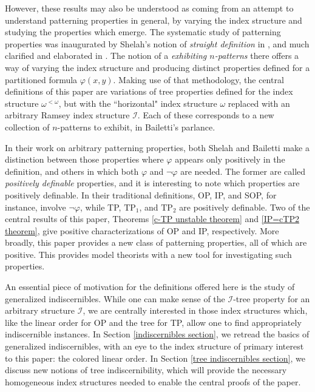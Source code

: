 \documentclass{article}
\newcommand{\calI}{\mathcal{I}}
\newcommand{\TPi}{\text{TP}_1}
\newcommand{\TPii}{\text{TP}_2}
\newcommand{\vphi}{\varphi}
\theoremstyle{definition}
\theoremstyle{definition}
\theoremstyle{definition}
\theoremstyle{definition}
\begin{document}
However, these results may also be understood as coming from an attempt to understand patterning properties in general, by varying the index structure and studying the properties which emerge. The systematic study of patterning properties was inaugurated by Shelah's notion of \textit{straight definition} in \cite{shelah_what_2000}, and much clarified and elaborated in \cite{bailetti_walk_2024}. The notion of a \textit{exhibiting $n$-patterns} there offers a way of varying the index structure and producing distinct properties defined for a partitioned formula $\vphi(x,y)$. Making use of that methodology, the central definitions of this paper are variations of tree properties defined for the index structure $\omega^{<\omega}$, but with the ``horizontal" index structure $\omega$ replaced with an arbitrary Ramsey index structure $\calI$. Each of these corresponds to a new collection of $n$-patterns to exhibit, in Bailetti's parlance.

In their work on arbitrary patterning properties, both Shelah and Bailetti make a distinction between those properties where $\vphi$ appears only positively in the definition, and others in which both $\vphi$ and $\neg\vphi$ are needed. The former are called \textit{positively definable} properties, and it is interesting to note which properties are positively definable. In their traditional definitions, OP, IP, and SOP, for instance, involve $\neg\vphi$, while TP, $\TPi$, and $\TPii$ are positively definable. Two of the central results of this paper, Theorems \ref{c-TP unstable theorem} and \ref{IP=cTP2 theorem}, give positive characterizations of OP and IP, respectively. More broadly, this paper provides a new class of patterning properties, all of which are positive. This provides model theorists with a new tool for investigating such properties.

An essential piece of motivation for the definitions offered here is the study of generalized indiscernibles. While one can make sense of the $\calI$-tree property for an arbitrary structure $\calI$, we are centrally interested in those index structures which, like the linear order for OP and the tree for TP, allow one to find appropriately indiscernible instances. In Section \ref{indiscernibles section}, we retread the basics of generalized indiscernibles, with an eye to the index structure of primary interest to this paper: the colored linear order. In Section \ref{tree indiscernibles section}, we discuss new notions of tree indiscernibility, which will provide the necessary homogeneous index structures needed to enable the central proofs of the paper.
\end{document}
